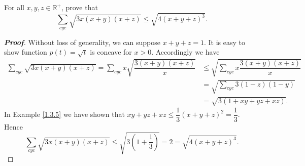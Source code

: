 \documentclass{memoir}
\begin{document}
\par \ \par \ 

\begin{example}
	For all $x,y,z\in\mathbb{R^+}$, prove that 
	\[
	\sum_{cyc}\sqrt{3x(x+y)(x+z)}\leqslant\sqrt{4(x+y+z)^3}.
	\] 
\end{example}

\begin{proof}[\textbf{Proof}]
		Without loss of generality, we can suppose $x+y+z=1$. It is easy to show function $p(t)=\sqrt{t}$ is concave for $x>0$. Accordingly we have 
		\begin{align*}
		\sum_{cyc}\sqrt{3x(x+y)(x+z)}=\sum_{cyc}x\sqrt{\dfrac{3(x+y)(x+z)}{x}}&\leqslant\sqrt{\sum_{cyc}x\dfrac{3(x+y)(x+z)}{x}}\\
		&=\sqrt{\sum_{cyc}3(1-z)(1-y)}\\
		&=\sqrt{3\left(1+xy+yz+xz\right)}.
		\end{align*}
	    In Example \autoref{1.3.5} we have shown that  
		$xy+yz+xz\leqslant \dfrac{1}{3}(x+y+z)^2=\dfrac{1}{3}$. Hence 
		\[
		\sum_{cyc}\sqrt{3x(x+y)(x+z)}\leqslant\sqrt{3\left(1+\dfrac{1}{3}\right)}=2=\sqrt{4(x+y+z)^3}.
		\]
\end{proof}
\par \ 	\par \ \par \ 
	
\end{document}

